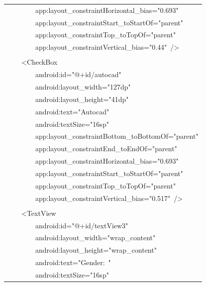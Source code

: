 \documentclass[a4paper,12pt]{article}
\begin{document}
\begin{longtable}{|p{}|}
{\ttfamily\small \ \ \ \ \ \ \ \ app:layout\_constraintHorizontal\_bias="0.693"} \\
{\ttfamily\small \ \ \ \ \ \ \ \ app:layout\_constraintStart\_toStartOf="parent"} \\
{\ttfamily\small \ \ \ \ \ \ \ \ app:layout\_constraintTop\_toTopOf="parent"} \\
{\ttfamily\small \ \ \ \ \ \ \ \ app:layout\_constraintVertical\_bias="0.44"\ /\textgreater{}} \\
\strut \\
{\ttfamily\small \ \ \ \ \textless{}CheckBox} \\
{\ttfamily\small \ \ \ \ \ \ \ \ android:id="@+id/autocad"} \\
{\ttfamily\small \ \ \ \ \ \ \ \ android:layout\_width="127dp"} \\
{\ttfamily\small \ \ \ \ \ \ \ \ android:layout\_height="41dp"} \\
{\ttfamily\small \ \ \ \ \ \ \ \ android:text="Autocad"} \\
{\ttfamily\small \ \ \ \ \ \ \ \ android:textSize="16sp"} \\
{\ttfamily\small \ \ \ \ \ \ \ \ app:layout\_constraintBottom\_toBottomOf="parent"} \\
{\ttfamily\small \ \ \ \ \ \ \ \ app:layout\_constraintEnd\_toEndOf="parent"} \\
{\ttfamily\small \ \ \ \ \ \ \ \ app:layout\_constraintHorizontal\_bias="0.693"} \\
{\ttfamily\small \ \ \ \ \ \ \ \ app:layout\_constraintStart\_toStartOf="parent"} \\
{\ttfamily\small \ \ \ \ \ \ \ \ app:layout\_constraintTop\_toTopOf="parent"} \\
{\ttfamily\small \ \ \ \ \ \ \ \ app:layout\_constraintVertical\_bias="0.517"\ /\textgreater{}} \\
\strut \\
{\ttfamily\small \ \ \ \ \textless{}TextView} \\
{\ttfamily\small \ \ \ \ \ \ \ \ android:id="@+id/textView3"} \\
{\ttfamily\small \ \ \ \ \ \ \ \ android:layout\_width="wrap\_content"} \\
{\ttfamily\small \ \ \ \ \ \ \ \ android:layout\_height="wrap\_content"} \\
{\ttfamily\small \ \ \ \ \ \ \ \ android:text="Gender:\ "} \\
{\ttfamily\small \ \ \ \ \ \ \ \ android:textSize="16sp"} \\

\end{longtable}
\end{document}
